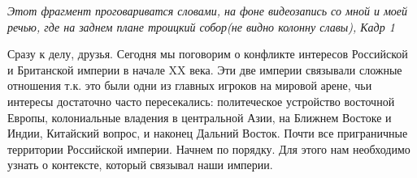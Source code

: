 \textit{Этот фрагмент проговариватся словами, на фоне видеозапись  со мной и моей речью, где на заднем плане троицкий собор(не видно колонну славы), Кадр 1}


Сразу к делу, друзья. Сегодня мы поговорим о конфликте интересов Российской и Британской империи в начале XX века. Эти две империи связывали сложные отношения т.к. это были одни из главных игроков на мировой арене, чьи интересы достаточно часто пересекались: политеческое устройство восточной Европы, колониальные владения в центральной Азии, на Ближнем Востоке и Индии, Китайский вопрос, и наконец Дальний Восток. Почти все приграничные территории Российской империи. 
Начнем по порядку. Для этого нам необходимо узнать о контексте, который связывал наши империи.